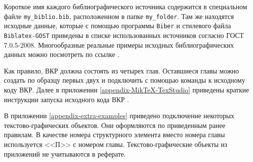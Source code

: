 Короткое имя каждого библиографического источника содержится в специальном файле \verb|my_biblio.bib|, расположенном в папке \verb|my_folder|. Там же находятся исходные данные, которые с помощью программы \texttt{Biber} и стилевого файла \texttt{Biblatex-GOST} \cite{ctan-biblatex-gost} приведены в списке использованных источников согласно ГОСТ 7.0.5-2008.
Многообразные реальные примеры исходных библиографических данных можно посмотреть по ссылке \cite{ctan-biblatex-gost-examples}.

Как правило, ВКР должна состоять из четырех глав. Оставшиеся главы можно создать по образцу первых двух и подключить с помощью команды \verb|| к исходному коду ВКР. Далее в приложении \ref{appendix-MikTeX-TexStudio} приведены краткие инструкции запуска исходного кода ВКР \cite{latex-miktex,latex-texstudio}.

В приложении \ref{appendix-extra-examples} приведено подключение некоторых текстово-графических объектов. Они оформляются по приведенным ранее правилам. В качестве номера структурного элемента вместо номера главы используется <<П>> с номером главы. Текстово-графические объекты из приложений не учитываются в реферате.



%

